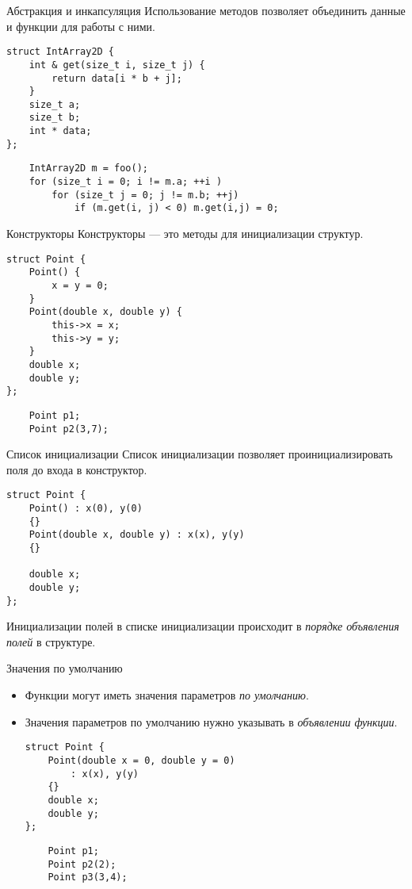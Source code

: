 \documentclass{beamer}
\begin{document}
\begin{frame}[fragile]{Абстракция и инкапсуляция}
    Использование методов позволяет объединить данные и функции для работы с ними.
\small
\begin{lstlisting}
struct IntArray2D {
    int & get(size_t i, size_t j) {
        return data[i * b + j];        
    }
    size_t a;
    size_t b;
    int * data;
};
\end{lstlisting}

\begin{lstlisting}
    IntArray2D m = foo();
    for (size_t i = 0; i != m.a; ++i )
        for (size_t j = 0; j != m.b; ++j)
            if (m.get(i, j) < 0) m.get(i,j) = 0;
\end{lstlisting}
\end{frame}

\begin{frame}[fragile]{Конструкторы}
    Конструкторы — это методы для инициализации структур.
\begin{lstlisting}
struct Point {
    Point() { 
        x = y = 0;
    }
    Point(double x, double y) {
        this->x = x;
        this->y = y;
    }
    double x;
    double y;
};
\end{lstlisting}
\begin{lstlisting}
    Point p1;
    Point p2(3,7);
\end{lstlisting}
\end{frame}

\begin{frame}[fragile]{Список инициализации}
    Список инициализации позволяет проинициализировать поля до входа в
    конструктор.
\begin{lstlisting}
struct Point {
    Point() : x(0), y(0) 
    {}
    Point(double x, double y) : x(x), y(y) 
    {}

    double x;
    double y;
};
\end{lstlisting}
Инициализации полей в списке инициализации
происходит в {\em порядке объявления полей} в структуре.
\end{frame}

\begin{frame}[fragile]{Значения по умолчанию}
    \begin{itemize}
        \item Функции могут иметь значения параметров {\em по умолчанию}.
        \item Значения параметров по умолчанию нужно указывать в {\em объявлении
            функции}.
\begin{lstlisting}
struct Point {
    Point(double x = 0, double y = 0) 
        : x(x), y(y)
    {}
    double x;
    double y;
};
\end{lstlisting}
\begin{lstlisting}
    Point p1;
    Point p2(2);
    Point p3(3,4);
\end{lstlisting}
    \end{itemize}
\end{frame}
\end{document}
